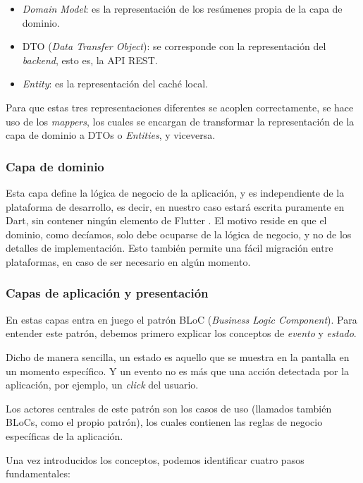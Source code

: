 \begin{itemize}[\textbullet]
	\item \emph{Domain Model}: es la representación de los resúmenes propia de la capa de dominio.
	\item DTO (\emph{Data Transfer Object}): se corresponde con la representación del \emph{backend}, esto es, la API REST.
	\item \emph{Entity}: es la representación del caché local.
\end{itemize}

Para que estas tres representaciones diferentes se acoplen correctamente, se hace uso de los \emph{mappers}, los cuales se encargan de transformar la representación de la capa de dominio a DTOs o \emph{Entities}, y viceversa.

\subsubsection{Capa de dominio}

Esta capa define la lógica de negocio de la aplicación, y es independiente de la plataforma de desarrollo, es decir, en nuestro caso estará escrita puramente en Dart, sin contener ningún elemento de Flutter \cite{flutter-clean-arch}. El motivo reside en que el dominio, como decíamos, solo debe ocuparse de la lógica de negocio, y no de los detalles de implementación. Esto también permite una fácil migración entre plataformas, en caso de ser necesario en algún momento.

\subsubsection{Capas de aplicación y presentación}

En estas capas entra en juego el patrón BLoC (\emph{Business Logic Component}). Para entender este patrón, debemos primero explicar los conceptos de \emph{evento} y \emph{estado}.

Dicho de manera sencilla, un estado es aquello que se muestra en la pantalla en un momento específico. Y un evento no es más que una acción detectada por la aplicación, por ejemplo, un \emph{click} del usuario.

Los actores centrales de este patrón son los casos de uso (llamados también BLoCs, como el propio patrón), los cuales contienen las reglas de negocio específicas de la aplicación.

Una vez introducidos los conceptos, podemos identificar cuatro pasos fundamentales:

